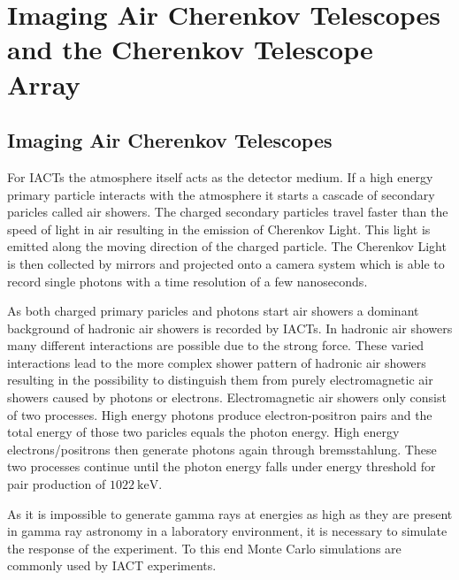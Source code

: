 \chapter{Imaging Air Cherenkov Telescopes and the Cherenkov Telescope Array}
\label{ch:cta}

\section{Imaging Air Cherenkov Telescopes}
For IACTs the atmosphere itself acts as the detector medium. 
If a high energy primary particle interacts with the atmosphere it starts a cascade of secondary paricles called air showers.
The charged secondary particles travel faster than the speed of light in air resulting in the emission of Cherenkov Light.
This light is emitted along the moving direction of the charged particle.
The Cherenkov Light is then collected by mirrors and projected onto a camera system which is able to record single photons with a time resolution of a few nanoseconds.

As both charged primary paricles and photons start air showers a dominant background of hadronic air showers is recorded by IACTs.
In hadronic air showers many different interactions are possible due to the strong force.
These varied interactions lead to the more complex shower pattern of hadronic air showers resulting in the possibility to distinguish them from purely electromagnetic
air showers caused by photons or electrons.
Electromagnetic air showers only consist of two processes. 
High energy photons produce electron-positron pairs and the total energy of those two paricles equals the photon energy. 
High energy electrons/positrons then generate photons again through bremsstahlung. 
These two processes continue until the photon energy falls under energy threshold for pair production of $\SI{1022}{\kilo\electronvolt}$.

As it is impossible to generate gamma rays at energies as high as they are present in gamma ray astronomy in a laboratory environment, it is 
necessary to simulate the response of the experiment.
To this end Monte Carlo simulations are commonly used by IACT experiments.


